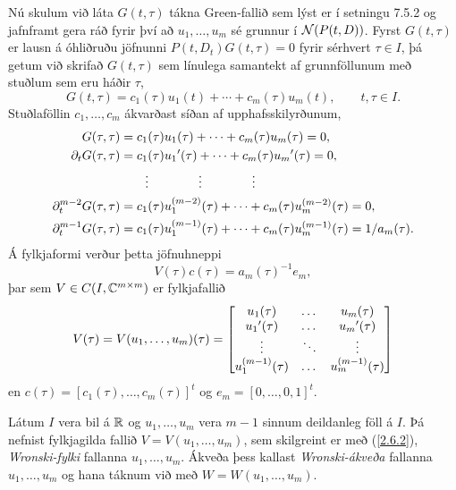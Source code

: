 \noindent
Nú skulum við láta $G(t,\tau)$ tákna Green-fallið sem lýst er í
setningu 7.5.2 og jafnframt gera ráð fyrir því að $u_1,\dots, u_m$ sé
grunnur í ${\cal N}(P(t,D))$.  Fyrst $G(t,\tau)$ er lausn á óhliðruðu
jöfnunni   $P(t,D_t)G(t,\tau)=0$
fyrir sérhvert  $\tau\in I$, þá getum við skrifað
$G(t,\tau)$ sem línulega samantekt af grunnföllunum með stuðlum sem
eru háðir $\tau$,
$$
G(t,\tau)=c_1(\tau)u_1(t)+\cdots+c_m(\tau)u_m(t), \qquad t,\tau\in I.
$$
Stuðlaföllin $c_1,\dots,c_m$ ákvarðast síðan af upphafsskilyrðunum,
\begin{align*}
G(\tau,\tau) &= c_1(\tau)u_1(\tau)+\cdots+c_m(\tau)u_m(\tau)=0,\\
\partial_tG(\tau,\tau) &= c_1(\tau)u_1{\sp{\prime}}(\tau)+
\cdots+c_m(\tau)u_m{\sp{\prime}}(\tau)=0,\\
&\qquad\vdots\qquad\qquad\vdots\qquad\qquad\vdots\\
\partial_t\sp{m-2}G(\tau,\tau) &= c_1(\tau)u_1\sp{(m-2)}(\tau)+
\cdots+c_m(\tau)u_m\sp{(m-2)}(\tau)=0,\\
\partial_t\sp{m-1}G(\tau,\tau) &= c_1(\tau)u_1\sp{(m-1)}(\tau)+
\cdots+c_m(\tau)u_m\sp{(m-1)}(\tau)=1/a_m({\tau}).
\end{align*}
Á fylkjaformi verður þetta jöfnuhneppi
 \begin{equation*}V(\tau)c(\tau)=a_m({\tau})^{-1}e_m,\label{2.6.1}
 \end{equation*}
þar sem $V\in C(I,{\mathbb C}\sp{m\times m})$ er fylkjafallið
 \begin{equation*}V(\tau)=V(u_1,\dots,u_m)(\tau)=
\left[\begin{matrix}
u_1(\tau)&\dots&u_m(\tau)\\
u_1{\sp{\prime}}(\tau)&\dots&u_m{\sp{\prime}}(\tau)\\
\vdots&\ddots&\vdots\\
u_1\sp{(m-1)}(\tau)&\dots&u_m\sp{(m-1)}(\tau)
\end{matrix}\right]
\label{2.6.2}
 \end{equation*}
en $c(\tau)=[c_1(\tau),\dots,c_m(\tau)]^t$ og $e_m=[0,\dots,0,1]^t$.

\begin{sk}
Látum $I$ vera bil á ${\mathbb R}$ og $u_1,\dots,u_m$ vera $m-1$ sinnum
deildanleg föll á $I$.  Þá nefnist fylkjagilda fallið
$V=V(u_1,\dots,u_m)$, sem skilgreint er með (\ref{2.6.2}),  {\it Wronski-fylki}
fallanna $u_1,\dots, u_m$.  Ákveða þess kallast {\it Wronski-ákveða}
fallanna $u_1,\dots, u_m$ og hana táknum við með 
$W=W(u_1,\dots,u_m)$.
\end{sk}

